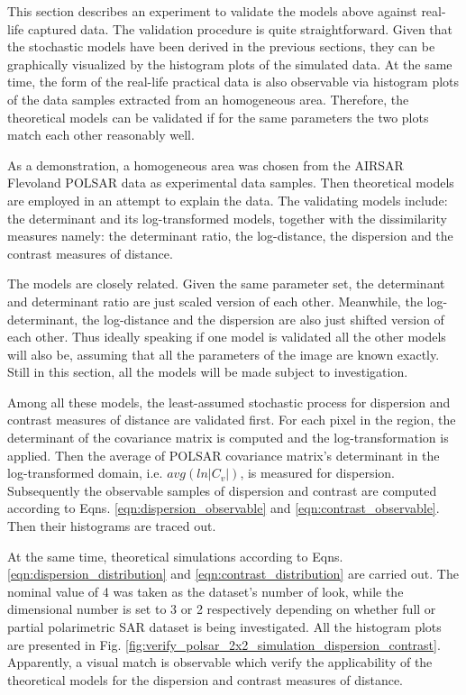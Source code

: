 \documentclass[journal]{IEEEtran}
\begin{document}
This section describes an experiment to validate the models above against real-life captured data.
The validation procedure is quite straightforward.
Given that the stochastic models have been derived in the previous sections, 
  they can be graphically visualized by the histogram plots of the simulated data.
At the same time, the form of the real-life practical data is also observable via histogram plots of the data samples extracted from an homogeneous area.
Therefore, the theoretical models can be validated 
  if for the same parameters 
  the two plots match each other reasonably well.

As a demonstration, a homogeneous area was chosen from the AIRSAR Flevoland POLSAR data as experimental data samples.
Then theoretical models are employed in an attempt to explain the data.
The validating models include:
  the determinant and its log-transformed models, together with the dissimilarity measures namely: the determinant ratio, the log-distance, the dispersion and the contrast measures of distance.
  
The models are closely related.
Given the same parameter set, the determinant and determinant ratio are just scaled version of each other.
Meanwhile, the log-determinant, the log-distance and the dispersion are also just shifted version of each other.
Thus ideally speaking
  if one model is validated all the other models will also be,
  assuming that all the parameters of the image are known exactly.
Still in this section, all the models will be made subject to investigation.

Among all these models, the least-assumed stochastic process for dispersion and contrast measures of distance are validated first.
For each pixel in the region, the determinant of the covariance matrix is computed and the log-transformation is applied.
Then the average of POLSAR covariance matrix’s determinant in the log-transformed domain, i.e. $avg(ln|C_v|)$, is measured for dispersion.
Subsequently the observable samples of dispersion and contrast are computed according to Eqns. \ref{eqn:dispersion_observable} and \ref{eqn:contrast_observable}.
Then their histograms are traced out.

At the same time, theoretical simulations according to Eqns. \ref{eqn:dispersion_distribution} and \ref{eqn:contrast_distribution} are carried out.
The nominal value of 4 was taken as the dataset's number of look,
 while the dimensional number is set to 3 or 2 respectively depending on whether full or partial polarimetric SAR dataset is being investigated.
All the histogram plots are presented in Fig. \ref {fig:verify_polsar_2x2_simulation_dispersion_contrast}.
Apparently, a visual match is observable which verify the applicability of the theoretical models for the dispersion and contrast measures of distance.
\end{document}
